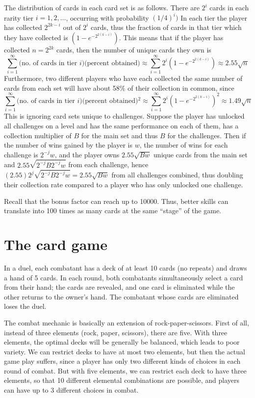 \documentclass[11pt]{article}
\begin{document}
The distribution of cards in each card set is as follows.
There are $2^i$ cards in each rarity tier $i=1,2,\hdots$, occurring with probability $(1/4)^i)$
In each tier the player has collected $2^{2k-i}$ out of $2^i$ cards, thus the fraction of
cards in that tier which they have collected is $(1-e^{-2^{2(k-i)}})$.
This means that if the player has collected $n=2^{2k}$ cards, then the number of unique cards they own is
\[
\sum_{i=1}^\infty \text{(no. of cards in tier $i$)(percent obtained)} 
\approx \sum_{i=1}^\infty 2^{i}(1-e^{-2^{2(k-i)}}) \approx 2.55 \sqrt{n}
\]
Furthermore, two different players who have each collected the same number of cards from each set will have about 58\% of their collection in common, since 
\[
\sum_{i=1}^\infty \text{(no. of cards in tier $i$)(percent obtained)$^2$} 
\approx \sum_{i=1}^\infty 2^{i}(1-e^{-2^{2(k-i)}})^2 \approx 1.49 \sqrt{n}
\]
This is ignoring card sets unique to challenges.
Suppose the player has unlocked all challenges on a level and has the same performance on each of them, has a collection multiplier of $B$ for the main set and thus $B$ for the challenges.
Then if the number of wins gained by the player is $w$, the number of wins for each challenge is $2^{-j} w$, and the player owns $2.55\sqrt{Bw}$ unique cards from the main set and $2.55 \sqrt{2^{-j}B 2^{-j}w}$ from each challenge, hence $(2.55) 2^j \sqrt{2^{-j}B 2^{-j}w} = 2.55\sqrt{Bw}$ from all challenges combined, thus doubling their collection rate compared to a player who has only unlocked one challenge.

Recall that the bonus factor can reach up to 10000.  Thus, better skills can translate into 100 times as many cards at the same ``stage'' of the game.

\section{The card game}

In a duel, each combatant has a deck of at least 10 cards (no repeats) and draws a hand of 5 cards.
In each round, both combatants simultaneously select a card from their hand;
the cards are revealed, and one card is eliminated while the other returns to the owner's hand.
The combatant whose cards are eliminated loses the duel.

The combat mechanic is basically an extension of rock-paper-scissors.
First of all, instead of three elements (rock, paper, scissors), there are five.
With three elements, the optimal decks will be generally be balanced,
which leads to poor variety.
We can restrict decks to have at most two elements, but then
the actual game play suffers, since a player has only two different kinds of choices in each round
of combat.
But with five elements, we can restrict each deck to have three elements,
so that 10 different elemental combinations are possible, and players can have up to 3 different
choices in combat.
\end{document}
